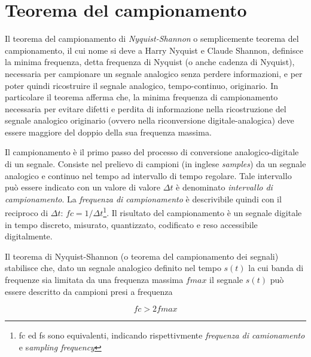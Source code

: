
\section{Teorema del campionamento}

Il teorema del campionamento di \emph{Nyquist-Shannon} o semplicemente teorema del
campionamento, il cui nome si deve a Harry Nyquist e
Claude Shannon, definisce la minima frequenza, detta
frequenza di Nyquist (o anche cadenza di Nyquist), necessaria per campionare un
segnale analogico senza perdere informazioni, e per poter quindi ricostruire il
segnale analogico, tempo-continuo, originario.
In particolare il teorema afferma che,
la minima frequenza di campionamento necessaria per evitare difetti e perdita di
informazione nella ricostruzione del segnale analogico originario (ovvero nella
riconversione digitale-analogica) deve essere maggiore del doppio della sua
frequenza massima.

Il campionamento è il primo passo del processo di conversione analogico-digitale
di un segnale. Consiste nel prelievo di campioni (in inglese \emph{samples}) da
un segnale analogico e continuo nel tempo ad intervallo di tempo regolare.
Tale intervallo può essere indicato con un valore di valore $\Delta t$ è denominato
\emph{intervallo di campionamento}. La \emph{frequenza di campionamento} è
descrivibile quindi con il reciproco di
$ \Delta t $: $ fc = 1/\Delta t $\footnote{fc ed fs sono equivalenti,
indicando rispettivmente \emph{frequenza di camionamento} e s\emph{ampling frequency}}.
Il risultato del campionamento è un segnale digitale in tempo discreto,
misurato, quantizzato, codificato e reso accessibile digitalmente.

Il teorema di Nyquist-Shannon (o teorema del campionamento dei segnali) stabilisce
che, dato un segnale analogico definito nel tempo $s(t)$ la cui banda di frequenze
sia limitata da una frequenza massima $fmax$ il segnale $s(t)$ può essere descritto
da campioni presi a frequenza

\begin{equation}
\label{sampling}
fc > 2fmax
\end{equation}

\clearpage

